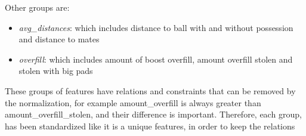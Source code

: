 Other groups are:
\begin{itemize}
    \item \textit{avg\_distances}: which includes distance to ball with and without possession and distance to mates
    \item \textit{overfill}: which includes amount of boost overfill, amount overfill stolen and stolen with big pads
\end{itemize}

These groups of features have relations and constraints that can be removed by the normalization, for example amount\_overfill is always greater than amount\_overfill\_stolen, and their difference is important. Therefore, each group, has been standardized like it is a unique features, in order to keep the relations
